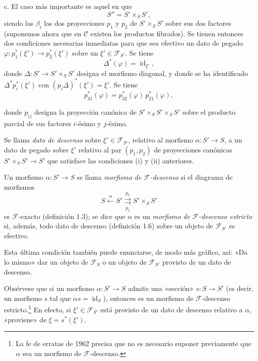 \medskip\noindent
c. El caso más importante es aquel en que
\[
  S''=S'\times_S S',
\]
siendo las $\beta_i$ las dos proyecciones $p_1$ y $p_2$ de
$S'\times_S S'$ sobre sus dos factores (suponemos ahora que en
$\mathcal C$ existen los productos fibrados). Se tienen entonces dos
condiciones necesarias inmediatas para que sea efectivo un dato de pegado
$\varphi:p_1^*(\xi')\longrightarrow p_2^*(\xi')$ sobre un
$\xi'\in\mathcal F_{S'}$. Se tiene
\[
  \tag{i}
  \Delta^*(\varphi)=\operatorname{id}_{\xi'},
\]
donde $\Delta:S'\longrightarrow S'\times_S S'$ designa el morfismo diagonal,
y donde se ha identificado $\Delta^*p_i^*(\xi')$ con
$(p_i\Delta)^*(\xi')=\xi'$. Se tiene
\[
  \tag{ii}
  p_{31}^*(\varphi)=p_{32}^*(\varphi)\,p_{21}^*(\varphi),
\]

donde $p_{ij}$ designa la proyección canónica de
$S'\times_S S'\times_S S'$ sobre el producto parcial de sus factores
$i$-ésimo y $j$-ésimo.

 Se llama \emph{dato de descenso} sobre
$\xi'\in\mathcal F_{S'}$, relativo al morfismo
$\alpha:S'\longrightarrow S$, a un dato de pegado sobre $\xi'$ relativo al par
$(p_1,p_2)$ de proyecciones canónicas
$S'\times_S S'\longrightarrow S'$ que satisface las condiciones (i) y (ii)
anteriores.

 Un morfismo $\alpha:S'\longrightarrow S$ se llama
\emph{morfismo de $\mathcal F$-descenso} si el diagrama de morfismos
\[
  S\xleftarrow{\alpha}S'
  \overset{p_1}{\underset{p_2}{\rightrightarrows}}S'\times_S S'
\]
es $\mathcal F$-exacto (definición 1.3); se dice que $\alpha$ es un
\emph{morfismo de $\mathcal F$-descenso estricto} si, además, todo dato de
descenso (definición 1.6) sobre un objeto de $\mathcal F_{S'}$ es efectivo.

Esta última condición también puede enunciarse, de modo más gráfico, así:
«Da lo mismo» dar un objeto de $\mathcal F_S$ o un objeto de
$\mathcal F_{S'}$ provisto de un dato de descenso.

Obsérvese que si un morfismo $\alpha:S'\longrightarrow S$ admite una «sección»
$s:S\longrightarrow S'$ (es decir, un morfismo $s$ tal que
$\alpha s=\operatorname{id}_S$), entonces es un morfismo de
$\mathcal F$-descenso estricto.\footnote{La fe de erratas de 1962 precisa que
no es necesario suponer previamente que $\alpha$ sea un morfismo de
$\mathcal F$-descenso.} En efecto, si $\xi'\in\mathcal F_{S'}$ está provisto de
un dato de descenso relativo a $\alpha$, «proviene» de
$\xi=s^*(\xi')$.


